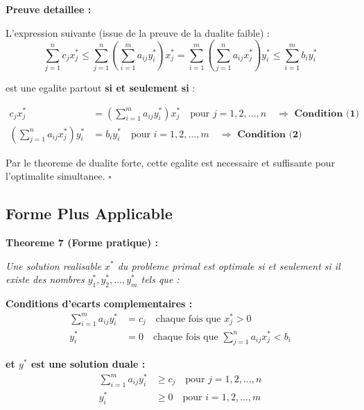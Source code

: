 \documentclass[12pt,a4paper]{article}
\begin{document}
\begin{methode}
\textbf{Preuve detaillee :}

L'expression suivante (issue de la preuve de la dualite faible) :
$$\sum_{j=1}^n c_j x_j^* \leq \sum_{j=1}^n \left(\sum_{i=1}^m a_{ij} y_i^*\right) x_j^* = \sum_{i=1}^m \left(\sum_{j=1}^n a_{ij} x_j^*\right) y_i^* \leq \sum_{i=1}^m b_i y_i^*$$

est une egalite partout \textcolor{importantrouge}{\textbf{si et seulement si}} :

\begin{align*}
c_j x_j^* &= \left(\sum_{i=1}^m a_{ij} y_i^*\right) x_j^* \quad \text{pour } j = 1, 2, \ldots, n \quad \Rightarrow \textbf{ Condition (1)}\\[6pt]
\left(\sum_{j=1}^n a_{ij} x_j^*\right) y_i^* &= b_i y_i^* \quad \text{pour } i = 1, 2, \ldots, m \quad \Rightarrow \textbf{ Condition (2)}
\end{align*}

Par le theoreme de dualite forte, cette egalite est necessaire et suffisante pour l'optimalite simultanee. $\square$
\end{methode}

\subsection{Forme Plus Applicable}

\begin{theoreme}
\textbf{Theoreme 7 (Forme pratique) :}

\textit{Une solution realisable $x^*$ du probleme primal est optimale si et seulement si il existe des nombres $y_1^*, y_2^*, \ldots, y_m^*$ tels que :}

\textbf{Conditions d'ecarts complementaires :}
\begin{align*}
\sum_{i=1}^{m} a_{ij} y_i^* &= c_j \quad \text{chaque fois que } x_j^* > 0\\
y_i^* &= 0 \quad \text{chaque fois que } \sum_{j=1}^{n} a_{ij} x_j^* < b_i
\end{align*}

\textbf{et $y^*$ est une solution duale :}
\begin{align*}
\sum_{i=1}^{m} a_{ij} y_i^* &\geq c_j \quad \text{pour } j = 1, 2, \ldots, n\\
y_i^* &\geq 0 \quad \text{pour } i = 1, 2, \ldots, m
\end{align*}
\end{theoreme}
\end{document}
